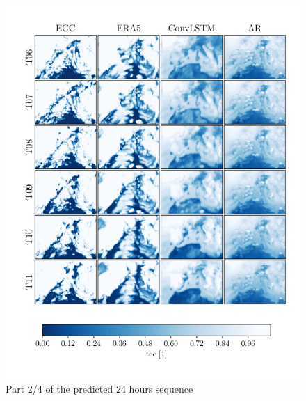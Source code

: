 \begin{figure}
    \centering
    \includegraphics{python_figs/comparting_seq_part_2_of4.png}
    \caption{Part 2/4 of the predicted 24 hours sequence }
    \label{fig:part2/4}
\end{figure}
